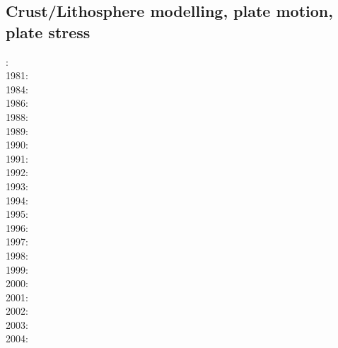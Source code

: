 \cite{yufl85}
\cite{loja95}
\cite{coli06}
\cite{wamg10}\cite{golw00}\cite{stgb10}\cite{cobe10}
\cite{algs12}\cite{roct12}\cite{crtm12}
\cite{ghbh13}\cite{yahb13}
\cite{macs16}
\cite{hulz18}

\subsection{Crust/Lithosphere modelling, plate motion, plate stress}

{\scriptsize
{}: \cite{crou77}\\
1981: \cite{brpo81}\\
1984: \cite{kupa84}\\
1986: \cite{stbb86}\\
1988: \cite{daco88}\cite{coda88}\\
1989: \cite{jabe89}\\
1990: \cite{chmo90}\\
1991: \cite{chbv91}\cite{daco91}\\
1992: \cite{moln92}\cite{budi92}\cite{kigw92}\\
1993: \cite{nefo93}\cite{brau93}\cite{grma93}\\
1994: \cite{buso94}\cite{befh94}\\
1995: \cite{belg95}\cite{brbe95}\cite{kian95}\cite{budi95}\cite{elfb95}\cite{zhgu95b}\\
1996: \cite{bekh96}\cite{berc96}\cite{jabh96}\\
1997: \cite{thsj97}\cite{babr97}\cite{bucl97}\cite{mole97}\\
1998: \cite{bird98}\cite{lecd98}\cite{kian98}\cite{mafs98}\cite{madu98}\cite{gumm98}
      \cite{berc98}\\
1999: \cite{will99b}\cite{bird99}\cite{clbp99}\cite{fugo99}\cite{mole99}\cite{lemo99}\\
2000: \cite{hanl00}\cite{labp00}\cite{lemm00}\cite{gumm00}\cite{lemo00}\cite{pepo00}
      \cite{scys00b}\\
2001: \cite{homo01}\cite{beoc01}\cite{kapo01}\\
2002: \cite{labu02}\cite{coli02}\cite{bast02}\cite{gedh02}\\
2003: \cite{wipo03}\cite{wabu03}\cite{geur03}\cite{upke03}\cite{vamf03}\cite{bupf03}\cite{lemm03}
      \cite{onmo03}\\
2004: \cite{tibb04}\cite{gewi04}\cite{colm04}\cite{pybe04}\\
}
